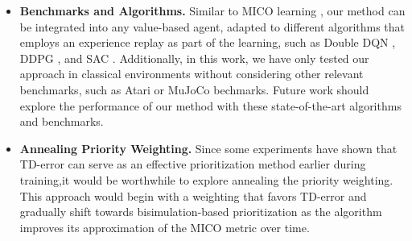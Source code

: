 \begin{itemize}
    \item \textbf{Benchmarks and Algorithms.} Similar to MICO learning \cite{castro2021mico},
    our method can be integrated into any value-based agent, adapted to different algorithms that  employs an experience replay as part of the learning, such as Double DQN \cite{van2016deep}, DDPG \cite{lillicrap2015continuous}, and SAC \cite{haarnoja2018soft}. Additionally, in this work, we have only tested our approach in classical environments without considering other relevant benchmarks, such as Atari \cite{bellemare2013arcade, machado2018revisiting} or MuJoCo \cite{todorov2012mujoco} bechmarks. Future work should explore the performance of our method with these state-of-the-art algorithms and benchmarks.
    \item \textbf{Annealing Priority Weighting.} Since some experiments have shown that TD-error can serve as an effective prioritization method earlier during training,it would be worthwhile to explore annealing the priority weighting. This approach would begin with a weighting that favors TD-error and gradually shift towards bisimulation-based prioritization as the algorithm improves its approximation of the MICO metric over time.
\end{itemize}






